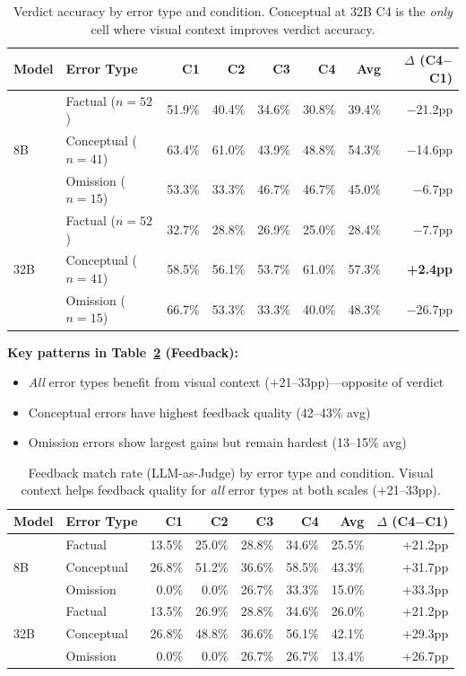 \documentclass{article} %
\begin{document}
\begin{table}[h]
\centering
\small
\begin{tabular}{@{}llrrrrrr@{}}
\toprule
Model & Error Type & C1 & C2 & C3 & C4 & Avg & $\Delta$ (C4$-$C1) \\
\midrule
\multirow{3}{*}{8B} & Factual ($n{=}52$) & 51.9\% & 40.4\% & 34.6\% & 30.8\% & 39.4\% & $-$21.2pp \\
 & Conceptual ($n{=}41$) & 63.4\% & 61.0\% & 43.9\% & 48.8\% & 54.3\% & $-$14.6pp \\
 & Omission ($n{=}15$) & 53.3\% & 33.3\% & 46.7\% & 46.7\% & 45.0\% & $-$6.7pp \\
\midrule
\multirow{3}{*}{32B} & Factual ($n{=}52$) & 32.7\% & 28.8\% & 26.9\% & 25.0\% & 28.4\% & $-$7.7pp \\
 & Conceptual ($n{=}41$) & 58.5\% & 56.1\% & 53.7\% & 61.0\% & 57.3\% & \textbf{+2.4pp} \\
 & Omission ($n{=}15$) & 66.7\% & 53.3\% & 33.3\% & 40.0\% & 48.3\% & $-$26.7pp \\
\bottomrule
\end{tabular}
\caption{Verdict accuracy by error type and condition. Conceptual at 32B C4 is the \textit{only} cell where visual context improves verdict accuracy.}
\label{tab:h3_verdict}
\end{table}

\noindent\textbf{Key patterns in Table~\ref{tab:h3_feedback} (Feedback):}
\begin{itemize}[itemsep=1pt, topsep=2pt, leftmargin=*]
  \item \textit{All} error types benefit from visual context ($+$21--33pp)---opposite of verdict
  \item Conceptual errors have highest feedback quality (42--43\% avg)
  \item Omission errors show largest gains but remain hardest (13--15\% avg)
\end{itemize}

\begin{table}[h]
\centering
\small
\begin{tabular}{@{}llrrrrrr@{}}
\toprule
Model & Error Type & C1 & C2 & C3 & C4 & Avg & $\Delta$ (C4$-$C1) \\
\midrule
\multirow{3}{*}{8B} & Factual & 13.5\% & 25.0\% & 28.8\% & 34.6\% & 25.5\% & +21.2pp \\
 & Conceptual & 26.8\% & 51.2\% & 36.6\% & 58.5\% & 43.3\% & +31.7pp \\
 & Omission & 0.0\% & 0.0\% & 26.7\% & 33.3\% & 15.0\% & +33.3pp \\
\midrule
\multirow{3}{*}{32B} & Factual & 13.5\% & 26.9\% & 28.8\% & 34.6\% & 26.0\% & +21.2pp \\
 & Conceptual & 26.8\% & 48.8\% & 36.6\% & 56.1\% & 42.1\% & +29.3pp \\
 & Omission & 0.0\% & 0.0\% & 26.7\% & 26.7\% & 13.4\% & +26.7pp \\
\bottomrule
\end{tabular}
\caption{Feedback match rate (LLM-as-Judge) by error type and condition. Visual context helps feedback quality for \textit{all} error types at both scales ($+$21--33pp).}
\label{tab:h3_feedback}
\end{table}
\end{document}
